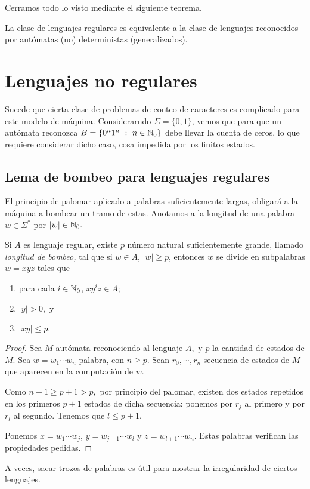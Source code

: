 Cerramos todo lo visto mediante el siguiente teorema.

\begin{teorema}
    La clase de lenguajes regulares es equivalente a la clase de lenguajes reconocidos por aut\'omatas (no) deterministas (generalizados).
\end{teorema}

\section{Lenguajes no regulares}

Sucede que cierta clase de problemas de conteo de caracteres es complicado para este modelo de m\'aquina. Considerarndo \(\Sigma=\{0,1\}\), vemos que para que un aut\'omata reconozca \(B=\{0^n1^n\ :\ n\in \mathbb{N}_0\}\) debe llevar la cuenta de ceros, lo que requiere considerar dicho caso, cosa impedida por los finitos estados.

\subsection{Lema de bombeo para lenguajes regulares}

El principio de palomar aplicado a palabras suficientemente largas, obligar\'a a la m\'aquina a bombear un tramo de estas. Anotamos a la longitud de una palabra \(w\in \Sigma^*\) por \(|w|\in\mathbb{N}_0.\)

\begin{teorema}
    Si \(A\) es lenguaje regular, existe \(p\) n\'umero natural suficientemente grande, llamado \emph{longitud de bombeo,} tal que si \(w\in A\), \(|w|\geq p\), entonces \(w\) se divide en subpalabras \(w=xyz\) tales que 
    \begin{enumerate}
        \item para cada \(i\in \mathbb{N}_0\), \(xy^iz\in A;\)
        \item \(|y|>0,\) y 
        \item \(|xy|\leq p.\)
    \end{enumerate}
\end{teorema}

\begin{proof}
    Sea \(M\) aut\'omata reconociendo al lenguaje \(A,\) y \(p\) la cantidad de estados de \(M.\)
    Sea \(w=w_1\cdots w_n\) palabra, con \(n\geq p.\)
    Sean \(r_0, \cdots, r_n\) secuencia de estados de \(M\) que aparecen en la computaci\'on de \(w.\)

    Como \(n+1\geq p+1 > p,\) por principio del palomar, existen dos estados repetidos en los primeros \(p+1\) estados de dicha secuencia: ponemos por \(r_j\) al primero y por \(r_l\) al segundo. Tenemos que \(l\leq p+1.\)

    Ponemos \(x=w_1\cdots w_j\), \(y=w_{j+1}\cdots w_l\) y \(z=w_{l+1}\cdots w_n\). Estas palabras verifican las propiedades pedidas.
\end{proof}

\begin{obs}
    A veces, sacar trozos de palabras es \'util para mostrar la irregularidad de ciertos lenguajes.
\end{obs}